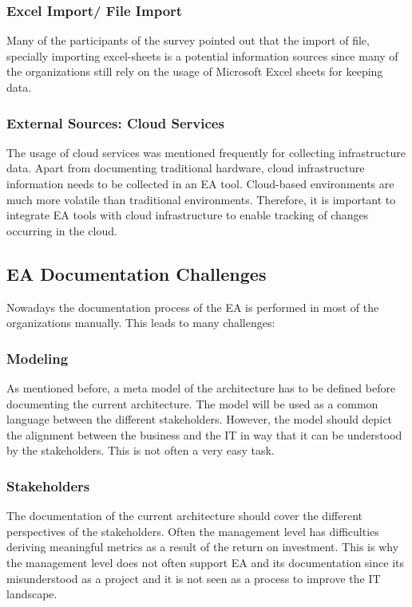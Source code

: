 \subsubsection{Excel Import/ File Import}
Many of the participants of the survey pointed out that the import of file, specially importing excel-sheets is a potential information sources since many of the organizations still rely on the usage of Microsoft Excel sheets for keeping data. \cite{Farwick2013}

\subsubsection{External Sources: Cloud Services}

The usage of cloud services was mentioned frequently for collecting infrastructure data. \cite{Farwick2010} Apart from documenting traditional hardware, cloud infrastructure information needs to be collected in an EA tool. Cloud-based environments are much more volatile than traditional environments. Therefore, it is important to integrate EA tools with cloud infrastructure to enable tracking of changes occurring in the cloud. \cite{Farwick2010}


\subsection{EA Documentation Challenges}

Nowadays the documentation process of the EA is performed in most of the organizations manually. This leads to many challenges:

\subsubsection{Modeling}
As mentioned before, a meta model of the architecture has to be defined before documenting the current architecture. The model will be used as a common language between the different stakeholders. However, the model should depict the alignment between the business and the IT in way that it can be understood by the stakeholders. This is not often a very easy task.

\subsubsection{Stakeholders}
The documentation of the current architecture should cover the different perspectives of the stakeholders. Often the management level has difficulties deriving meaningful metrics as a result of the return on investment. This is why the management level does not often support EA and its documentation since its misunderstood as a project and it is not seen as a process to improve the IT landscape.

